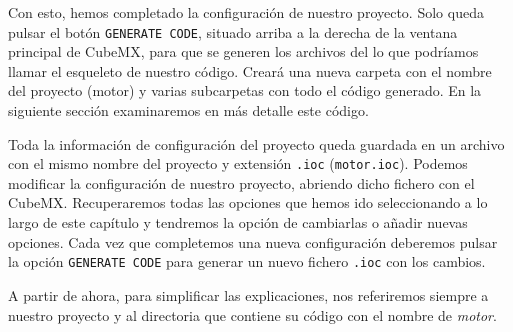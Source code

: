 Con esto, hemos completado la configuración de nuestro proyecto. Solo queda pulsar el botón \texttt{GENERATE CODE}, situado arriba a la derecha de la ventana principal de CubeMX, para que se generen los archivos del lo que podríamos llamar el esqueleto de nuestro código. Creará una nueva carpeta con el nombre del proyecto (motor) y varias subcarpetas con todo el código generado. En la siguiente sección examinaremos en más detalle este código. 

Toda la información de configuración del proyecto queda guardada en un archivo con el mismo nombre del proyecto y extensión \texttt{.ioc} (\texttt{motor.ioc}). Podemos modificar la configuración de nuestro proyecto, abriendo dicho fichero con el CubeMX. Recuperaremos todas las opciones que hemos ido seleccionando a lo largo de este capítulo y tendremos la opción de cambiarlas o añadir nuevas opciones. Cada vez que completemos una nueva configuración deberemos pulsar la opción \texttt{GENERATE CODE} para generar un nuevo fichero \texttt{.ioc} con los cambios.

A partir de ahora, para simplificar las explicaciones, nos referiremos siempre a nuestro proyecto y al directoria que contiene su código con el nombre de \emph{motor}.  
